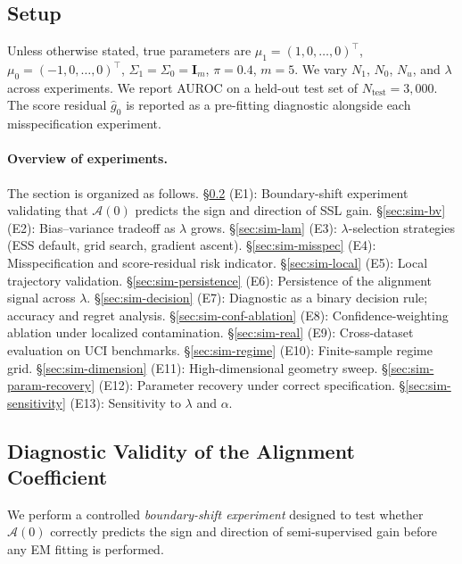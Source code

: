 \documentclass[11pt]{article}
\theoremstyle{definition}
\newcommand{\bI}{\mathbf{I}}
\newcommand{\lam}{\lambda}
\newcommand{\Sig}{\Sigma}
\newcommand{\calA}{\mathcal{A}}
\begin{document}
\subsection{Setup}

Unless otherwise stated, true parameters are
\(\mu_1=(1,0,\ldots,0)^\top\), \(\mu_0=(-1,0,\ldots,0)^\top\),
\(\Sig_1=\Sig_0=\bI_m\), \(\pi=0.4\), \(m=5\).
We vary \(N_1\), \(N_0\), \(N_u\), and \(\lam\) across experiments.
We report AUROC on a held-out test set of \(N_{\mathrm{test}}=3{,}000\).
The score residual \(\hat g_0\) is reported as a pre-fitting diagnostic
alongside each misspecification experiment.

\paragraph{Overview of experiments.}
The section is organized as follows.
\S\ref{sec:sim-diagnostic} (E1): Boundary-shift experiment validating
that \(\calA(0)\) predicts the sign and direction of SSL gain.
\S\ref{sec:sim-bv} (E2): Bias--variance tradeoff as \(\lam\) grows.
\S\ref{sec:sim-lam} (E3): \(\lam\)-selection strategies
(ESS default, grid search, gradient ascent).
\S\ref{sec:sim-misspec} (E4): Misspecification and score-residual
risk indicator.
\S\ref{sec:sim-local} (E5): Local trajectory validation.
\S\ref{sec:sim-persistence} (E6): Persistence of the alignment signal
across \(\lam\).
\S\ref{sec:sim-decision} (E7): Diagnostic as a binary decision rule;
accuracy and regret analysis.
\S\ref{sec:sim-conf-ablation} (E8): Confidence-weighting ablation
under localized contamination.
\S\ref{sec:sim-real} (E9): Cross-dataset evaluation on UCI benchmarks.
\S\ref{sec:sim-regime} (E10): Finite-sample regime grid.
\S\ref{sec:sim-dimension} (E11): High-dimensional geometry sweep.
\S\ref{sec:sim-param-recovery} (E12): Parameter recovery under correct specification.
\S\ref{sec:sim-sensitivity} (E13): Sensitivity to \(\lam\) and \(\alpha\).

\subsection{Diagnostic Validity of the Alignment Coefficient}
\label{sec:sim-diagnostic}

We perform a controlled \emph{boundary-shift experiment} designed to
test whether \(\calA(0)\) correctly predicts the sign and direction of
semi-supervised gain before any EM fitting is performed.
\end{document}
